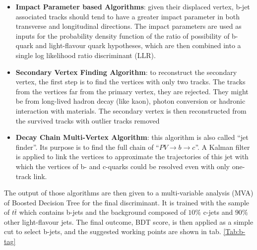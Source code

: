 \begin{itemize}
	\item {\bf Impact Parameter based Algorithms}: given their displaced vertex, b-jet associated tracks should tend to have a greater impact parameter in both transverse and longitudinal directions. The impact parameters are used as inputs for the probability density function of the ratio of possibility of b-quark and light-flavour quark hypotheses, which are then combined into a single log likelihood ratio discriminant (LLR).
	\item {\bf Secondary Vertex Finding Algorithm}: to reconstruct the secondary vertex, the first step is to find the vertices with only two tracks. The tracks from the vertices far from the primary vertex, they are rejected. They might be from long-lived hadron decay (like kaon), photon conversion or hadronic interaction with materials.  The secondary vertex is then reconstructed from the survived tracks with outlier tracks removed
	\item {\bf Decay Chain Multi-Vertex Algorithm}: this algorithm is also called ``jet finder''. Its purpose is to find the full chain of ``$PV \rightarrow b \rightarrow c$''. A Kalman filter is applied to link the vertices to approximate the trajectories of this jet with which the vertices of b- and c-quarks could be resolved even with only one-track link.  
\end{itemize}
\noindent
The output of those algorithms are then given to a multi-variable analysis (MVA) of Boosted Decision Tree for the final discriminant. It is trained with the sample of $t\bar{t}$ which contains b-jets and the background composed of $10\%$ c-jets and $90\%$ other light-flavour jets. The final outcome, BDT score, is then applied as a simple cut to select b-jets, and the suggested working points are shown in tab. \ref{Tab:b-tag}

